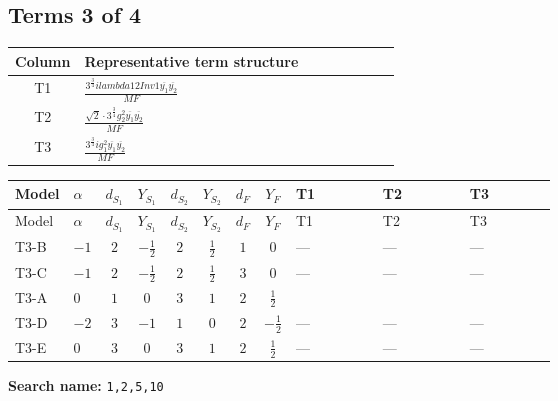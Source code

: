 \documentclass[8pt]{article}
\begin{document}
\begin{landscape}
\subsection*{Terms 3 of 4}
\begin{center}
\begin{tabular}{@{}c >{\raggedright\arraybackslash}p{0.82\linewidth}@{}}
\toprule
Column & Representative term structure \\
\midrule
T1 & \(\displaystyle \frac{3^{\frac{3}{4}} i lambda12Inv1 \overline{y_{1}} \overline{y_{2}}}{MF}\) \\
\midrule
T2 & \(\displaystyle \frac{\sqrt{2} \cdot 3^{\frac{3}{4}} g_{2}^{2} \overline{y_{1}} \overline{y_{2}}}{MF}\) \\
\midrule
T3 & \(\displaystyle \frac{3^{\frac{3}{4}} i g_{1}^{2} \overline{y_{1}} \overline{y_{2}}}{MF}\) \\
\midrule
\bottomrule
\end{tabular}
\end{center}
\smallskip
\tiny
\begin{longtable}{@{}llcccccc >{\raggedright\arraybackslash}p{0.21\linewidth} >{\raggedright\arraybackslash}p{0.21\linewidth} >{\raggedright\arraybackslash}p{0.21\linewidth}@{}}
\toprule
Model & $\alpha$ & $d_{S_1}$ & $Y_{S_1}$ & $d_{S_2}$ & $Y_{S_2}$ & $d_F$ & $Y_F$ & T1 & T2 & T3 \\
\midrule
\endfirsthead
\toprule
Model & $\alpha$ & $d_{S_1}$ & $Y_{S_1}$ & $d_{S_2}$ & $Y_{S_2}$ & $d_F$ & $Y_F$ & T1 & T2 & T3 \\
\midrule
\endhead
T3-B & $-1$ & $2$ & $-\frac{1}{2}$ & $2$ & $\frac{1}{2}$ & $1$ & $0$ & --- & --- & --- \\
\midrule
T3-C & $-1$ & $2$ & $-\frac{1}{2}$ & $2$ & $\frac{1}{2}$ & $3$ & $0$ & --- & --- & --- \\
\midrule
T3-A & $0$ & $1$ & $0$ & $3$ & $1$ & $2$ & $\frac{1}{2}$ & \scriptsize\adjustbox{max width=\linewidth}{$\begin{gathered} \frac{3^{\frac{3}{4}} i lambda12Inv1 \overline{y_{1}} \overline{y_{2}}}{6 MF}\end{gathered}$} & \scriptsize\adjustbox{max width=\linewidth}{$\begin{gathered} \frac{\sqrt{2} \cdot 3^{\frac{3}{4}} g_{2}^{2} \overline{y_{1}} \overline{y_{2}}}{6 MF}\end{gathered}$} & \scriptsize\adjustbox{max width=\linewidth}{$\begin{gathered} \frac{3^{\frac{3}{4}} i g_{1}^{2} \overline{y_{1}} \overline{y_{2}}}{8 MF}\end{gathered}$} \\
\midrule
T3-D & $-2$ & $3$ & $-1$ & $1$ & $0$ & $2$ & $-\frac{1}{2}$ & --- & --- & --- \\
\midrule
T3-E & $0$ & $3$ & $0$ & $3$ & $1$ & $2$ & $\frac{1}{2}$ & --- & --- & --- \\
\midrule
\bottomrule
\end{longtable}
\clearpage
\noindent\textbf{Search name: }\texttt{1,2,5,10}\par\smallskip

\end{landscape}
\end{document}
